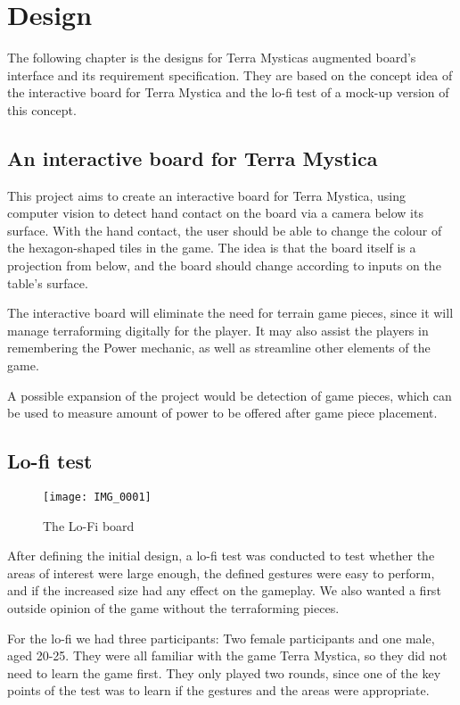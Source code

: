 \chapter{Design}\label{ch:design}
The following chapter is the designs for Terra Mysticas augmented board's interface and its requirement specification. They are based on the concept idea of the interactive board for Terra Mystica and the lo-fi test of a mock-up version of this concept.

\section{An interactive board for Terra Mystica}
This project aims to create an interactive board for Terra Mystica, using computer vision to detect hand contact on the board via a camera below its surface. With the hand contact, the user should be able to change the colour of the hexagon-shaped tiles in the game. The idea is that the board itself is a projection from below, and the board should change according to inputs on the table's surface.

The interactive board will eliminate the need for terrain game pieces, since it will manage terraforming digitally for the player. It may also assist the players in remembering the Power mechanic, as well as streamline other elements of the game.

A possible expansion of the project would be detection of game pieces, which can be used to measure amount of power to be offered after game piece placement.

\section{Lo-fi test}
\begin{figure}
\centering
\texttt{[image: IMG\_0001]}
\caption{The Lo-Fi board}
\end{figure}

After defining the initial design, a lo-fi test was conducted to test whether the areas of interest were large enough, the defined gestures were easy to perform, and if the increased size had any effect on the gameplay. We also wanted a first outside opinion of the game without the terraforming pieces. 

For the lo-fi we had three participants: Two female participants and one male, aged 20-25. 
They were all familiar with the game Terra Mystica, so they did not need to learn the game first. They only played two rounds, since one of the key points of the test was to learn if the gestures and the areas were appropriate. 

